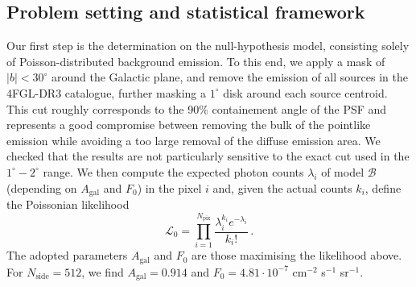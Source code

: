 \subsection{Problem setting and statistical framework}
\label{sec:procedure}
Our first step is the determination on the null-hypothesis model, consisting solely 
of Poisson-distributed background emission.
%
To this end, we apply a mask of  $|b|<30^\circ$ around the Galactic plane, and remove the emission of all 
sources in the 4FGL-DR3 catalogue, further masking a $1^\circ$ disk around each source centroid. This cut roughly corresponds to the 90\% containement angle of the PSF and represents a good compromise between removing the bulk of the pointlike emission while avoiding a too large removal of the diffuse emission area. We checked that the results are not particularly sensitive to the exact cut used in the $1^\circ-2^\circ$ range. 
%
We then compute the expected photon counts $\lambda_i$ of model $\mathcal{B}$ (depending on $A_\textrm{gal}$  and $ F_{0}$) in the pixel $i$  and, given the actual counts $k_i$, define the Poissonian likelihood  
\begin{equation}
\mathcal{L}_0=\prod_{i=1}^{N_\textrm{pix}} \frac{\lambda_i^{k_i}e^{-{\lambda_i}}}{k_i!}\, .
\end{equation}
The adopted parameters $A_\textrm{gal}$  and $ F_{0}$ are those maximising the likelihood above. For $N_\textrm{side}=512$, we find $A_\textrm{gal}=0.914$ and $F_0=4.81\cdot 10^{-7}$ cm$^{-2}$ s$^{-1}$ sr$^{-1}$.
%


